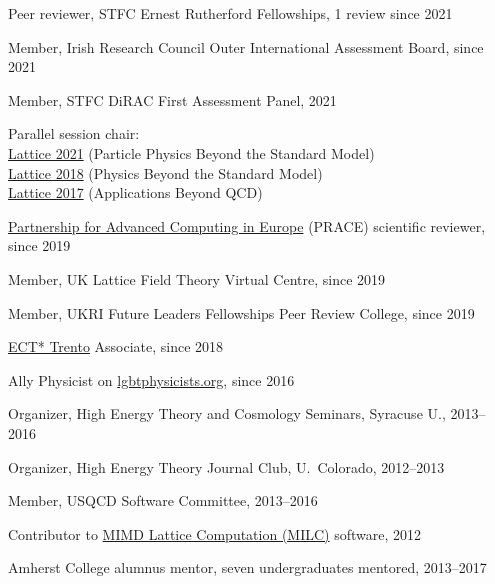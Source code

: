 \documentclass[10 pt]{article}
\newenvironment{tightlist}
  {\begin{list} {} {\setlength{\topsep}{-8 pt} \setlength{\itemsep}{-3 pt} \setlength{\leftmargin}{0 mm}}}{\end{list}}
\begin{document}
\vspace{-12 pt} %
\begin{tightlist}
  \item Peer reviewer, STFC Ernest Rutherford Fellowships, 1 review since 2021
  \item Member, Irish Research Council Outer International Assessment Board, since 2021 %
  \item Member, STFC DiRAC First Assessment Panel, 2021
  \item Parallel session chair:                                                                                    \\
    \qquad \href{https://indico.cern.ch/event/1006302/}{Lattice 2021} (Particle Physics Beyond the Standard Model) \\
    \qquad \href{https://web.pa.msu.edu/conf/Lattice2018/}{Lattice 2018} (Physics Beyond the Standard Model)       \\
    \qquad \href{http://wpd.ugr.es/~lattice2017/}{Lattice 2017} (Applications Beyond QCD)
  \item \href{http://www.prace-ri.eu}{Partnership for Advanced Computing in Europe} (PRACE) scientific reviewer, since 2019 %
  \item Member, UK Lattice Field Theory Virtual Centre, since 2019
  \item Member, UKRI Future Leaders Fellowships Peer Review College, since 2019 %
  \item \href{http://www.ectstar.eu}{ECT* Trento} Associate, since 2018 %
  \item Ally Physicist on \href{http://lgbtphysicists.org}{lgbtphysicists.org}, since 2016 %
  \item Organizer, High Energy Theory and Cosmology Seminars, Syracuse U., 2013--2016
  \item Organizer, High Energy Theory Journal Club, U.~Colorado, 2012--2013
  \item Member, USQCD Software Committee, 2013--2016
  \item Contributor to \href{http://www.physics.utah.edu/~detar/milc/}{MIMD Lattice Computation (MILC)} software, 2012
  \item Amherst College alumnus mentor, seven undergraduates mentored, 2013--2017 %
\end{tightlist}
\end{document}
